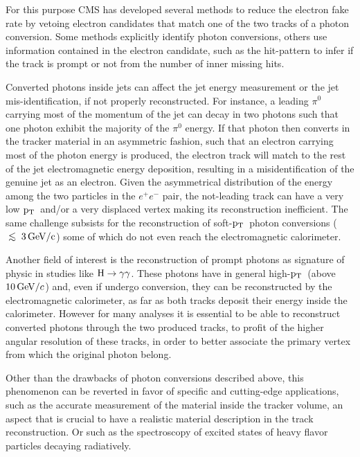 \documentclass[a4paper]{jpconf}
\def\centeron#1#2{{\setbox0=\hbox{#1}\setbox1=\hbox{#2}\ifdim
\wd1>\wd0\kern.5\wd1\kern-.5\wd0\fi
\copy0\kern-.5\wd0\kern-.5\wd1\copy1\ifdim\wd0>\wd1
\kern.5\wd0\kern-.5\wd1\fi}}
\def\ltap{\;\centeron{\raise.35ex\hbox{$<$}}{\lower.65ex\hbox{$\sim$}}\;}
\def\lsim{\mathrel{\ltap}}
\def \pt{$\p_{\rm T}$~}
\begin{document}
For this purpose 
CMS has developed several methods  to reduce the electron fake rate by  vetoing electron candidates that match one of the two tracks of a photon conversion. Some methods explicitly identify photon conversions, others use information contained in the electron candidate,  such as the hit-pattern to infer if the track is prompt or not from the  number of inner missing hits.

	
Converted photons inside jets can affect  the jet energy measurement or the jet mis-identification, if not properly reconstructed. 
For instance, a leading $\pi^0$ carrying most of the momentum of the jet can decay in two photons such that one photon exhibit the majority of the $\pi^0$ energy. If that photon then converts in the tracker material in an asymmetric fashion, such that an electron carrying most of the photon energy is produced, the electron track will match to the rest of the jet electromagnetic energy deposition, resulting in a misidentification of the genuine jet as an electron.
%
Given the asymmetrical distribution of the energy among the two particles in the $e^+ e^-$ pair, the not-leading track can have a very low \pt and/or a very displaced vertex making its 
 reconstruction inefficient.
 The same challenge subsists for the reconstruction of soft-\pt photon conversions ($\rm \lsim 3 \GeVc$) some of which do not even reach the electromagnetic calorimeter.

Another field of interest is the reconstruction of prompt photons as signature of  physic in studies like $\rm H \to \gamma \gamma$.
These photons  have in general high-\pt (above $10{\rm \, GeV}/c$) and, even if undergo conversion, they can be reconstructed by the electromagnetic calorimeter, as far as both tracks deposit their energy inside the calorimeter.
However for many analyses it is essential to be able to reconstruct  converted photons through the two produced tracks, to profit of the higher angular resolution of these tracks, in order to  better associate the primary vertex from which the original photon belong.  

Other than the drawbacks of photon conversions described above, this phenomenon can be reverted in favor of specific and cutting-edge applications, such as the accurate measurement of the material inside the tracker volume, an aspect that is crucial to have a realistic  material description in the track reconstruction. Or such as the spectroscopy of excited states of heavy flavor particles decaying radiatively. 
\end{document}
